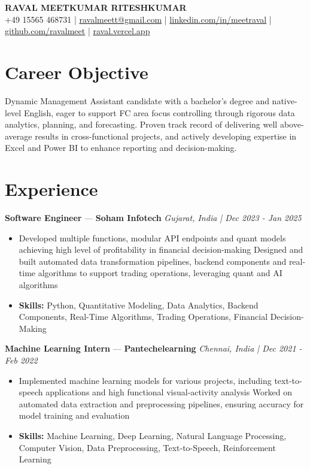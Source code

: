 \documentclass[a4paper,10pt]{article}
\begin{document}
\begin{center}
  {\Large\bfseries RAVAL MEETKUMAR RITESHKUMAR}\\[2pt]
  {\small +49 15565 468731 \;|\; \href{mailto:ravalmeett@gmail.com}{ravalmeett@gmail.com} \;|\; \href{https://www.linkedin.com/in/meetraval/}{linkedin.com/in/meetraval} \;|\; \href{https://github.com/ravalmeet}{github.com/ravalmeet} \;|\; \href{https://raval.vercel.app/}{raval.vercel.app}}
\end{center}
\vspace{-3pt}

\section*{Career Objective}
Dynamic Management Assistant candidate with a bachelor's degree and native-level English, eager to support FC area focus controlling through rigorous data analytics, planning, and forecasting. Proven track record of delivering well above-average results in cross-functional projects, and actively developing expertise in Excel and Power BI to enhance reporting and decision-making.\par

\section*{Experience}
\textbf{Software Engineer} — \textbf{Soham Infotech} \hfill \textit{Gujarat, India \;|\; Dec 2023 - Jan 2025}\par
\vspace{1pt}
\begin{itemize}
  \item Developed multiple functions, modular API endpoints and quant models achieving high level of profitability in financial decision-making Designed and built automated data transformation pipelines, backend components and real-time algorithms to support trading operations, leveraging quant and AI algorithms
  \item \textbf{Skills:} Python, Quantitative Modeling, Data Analytics, Backend Components, Real-Time Algorithms, Trading Operations, Financial Decision-Making
\end{itemize}
\vspace{3pt}
\textbf{Machine Learning Intern} — \textbf{Pantechelearning} \hfill \textit{Chennai, India \;|\; Dec 2021 - Feb 2022}\par
\vspace{1pt}
\begin{itemize}
  \item Implemented machine learning models for various projects, including text-to-speech applications and high functional visual-activity analysis Worked on automated data extraction and preprocessing pipelines, ensuring accuracy for model training and evaluation
  \item \textbf{Skills:} Machine Learning, Deep Learning, Natural Language Processing, Computer Vision, Data Preprocessing, Text-to-Speech, Reinforcement Learning
\end{itemize}
\end{document}
